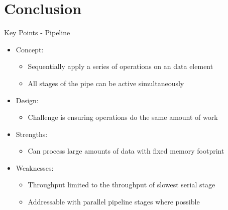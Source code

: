 \documentclass[xcolor=dvipsnames]{beamer}
\begin{document}
	\section{Conclusion}
		  \begin{frame}{Key Points - Pipeline}
				\begin{itemize}
			      \item Concept: 
			      	\begin{itemize}
			      		\item Sequentially apply a series of operations on an data element
			      		\item All stages of the pipe can be active simultaneously
			      	\end{itemize}
			      \item Design:
			      	\begin{itemize}
			      		\item Challenge is ensuring operations do the same amount of work
			      	\end{itemize} 
			       \item Strengths:
			       \begin{itemize}
			       		\item Can process large amounts of data with fixed memory footprint
			       \end{itemize}
				 \item Weaknesses:
				 	\begin{itemize}
				 		\item Throughput limited to the throughput of slowest serial stage
				 		\item Addressable with parallel pipeline stages where possible
				 	\end{itemize}
				\end{itemize}
			\end{frame}
\end{document}
